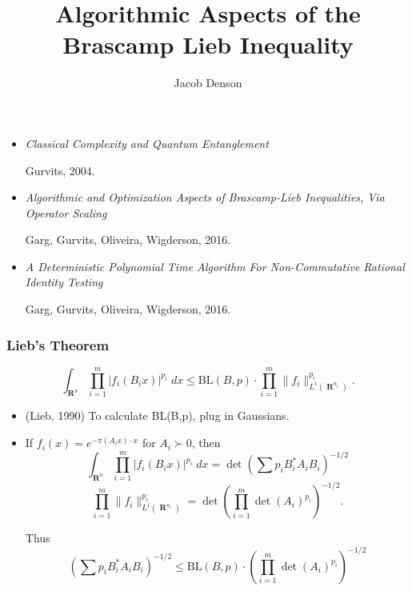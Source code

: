 \documentclass[handout,usenames,dvipsnames,12pt]{beamer}
\title{Algorithmic Aspects of the Brascamp Lieb Inequality}
\author{Jacob Denson}
\institute{University of Wisconsin Madison}
\DeclareMathOperator{\RR}{\mathbf{R}}
\begin{document}
\maketitle

\begin{frame}

\begin{itemize}
    \item \emph{Classical Complexity and Quantum Entanglement}

    Gurvits, 2004.
    \item \emph{Algorithmic and Optimization Aspects of Brascamp-Lieb Inequalities, Via Operator Scaling}

    Garg, Gurvits, Oliveira, Wigderson, 2016.
    \item \emph{A Deterministic Polynomial Time Algorithm For Non-Commutative Rational Identity Testing}

    Garg, Gurvits, Oliveira, Wigderson, 2016.
\end{itemize}

\end{frame}

\begin{frame}
    \frametitle{Lieb's Theorem}

    \vspace{-1em}
    \[ \int_{\RR^n} \prod_{i = 1}^m |f_i(B_i x)|^{p_i}\; dx \leq \text{BL}(B,p) \cdot \prod_{i=1}^m \| f_i \|_{L^1(\RR^{n_i})}^{p_i}.  \]

    \begin{itemize}
        \pause
        \item (Lieb, 1990) To calculate BL(B,p), plug in Gaussians.

        \pause
        \item If $f_i(x) = e^{- \pi (A_i x) \cdot x}$ for $A_i \succ 0$, then
        \pause
        \[ \int_{\RR^n} \prod_{i = 1}^m |f_i(B_i x)|^{p_i}\; dx = \det(\sum p_i B_i^* A_i B_i)^{-1/2} \]
        \pause
        \[ \prod_{i = 1}^m \| f_i \|_{L^1(\RR^{n_i})}^{p_i} = \det(\prod_{i = 1}^m \det(A_i)^{p_i})^{-1/2}. \]

        Thus
        \[ (\sum p_i B_i^* A_i B_i)^{-1/2} \leq \text{BL}(B,p) \cdot (\prod_{i = 1}^m \det(A_i)^{p_i})^{-1/2} \]

    \end{itemize}
\end{frame}
\end{document}
